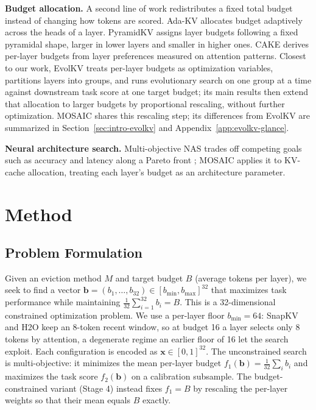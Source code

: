 \documentclass[11pt]{article}
\begin{document}
\textbf{Budget allocation.} A second line of work redistributes a fixed total budget instead of changing how tokens are scored. Ada-KV \citep{feng2025adakv} allocates budget adaptively across the heads of a layer. PyramidKV \citep{cai2025pyramidkv} assigns layer budgets following a fixed pyramidal shape, larger in lower layers and smaller in higher ones. CAKE \citep{qin2025cake} derives per-layer budgets from layer preferences measured on attention patterns. Closest to our work, EvolKV \citep{yu2025evolkv} treats per-layer budgets as optimization variables, partitions layers into groups, and runs evolutionary search on one group at a time against downstream task score at one target budget; its main results then extend that allocation to larger budgets by proportional rescaling, without further optimization. MOSAIC shares this rescaling step; its differences from EvolKV are summarized in Section~\ref{sec:intro-evolkv} and Appendix~\ref{app:evolkv-glance}.

\textbf{Neural architecture search.} Multi-objective NAS trades off competing goals such as accuracy and latency along a Pareto front \citep{elsken2018neural}; MOSAIC applies it to KV-cache allocation, treating each layer's budget as an architecture parameter.

\section{Method}

\subsection{Problem Formulation}

Given an eviction method $M$ and target budget $B$ (average tokens per layer), we seek to find a vector $\mathbf{b} = (b_1, \ldots, b_{32}) \in [b_{\min}, b_{\max}]^{32}$ that maximizes task performance while maintaining $\frac{1}{32}\sum_{i=1}^{32} b_i = B$. This is a 32-dimensional constrained optimization problem. We use a per-layer floor $b_{\min} = 64$: SnapKV and H2O keep an 8-token recent window, so at budget 16 a layer selects only 8 tokens by attention, a degenerate regime an earlier floor of 16 let the search exploit. Each configuration is encoded as $\mathbf{x} \in [0,1]^{32}$. The unconstrained search is multi-objective: it minimizes the mean per-layer budget $f_1(\mathbf{b}) = \frac{1}{32}\sum_i b_i$ and maximizes the task score $f_2(\mathbf{b})$ on a calibration subsample. The budget-constrained variant (Stage 4) instead fixes $f_1 = B$ by rescaling the per-layer weights so that their mean equals $B$ exactly.
\end{document}
